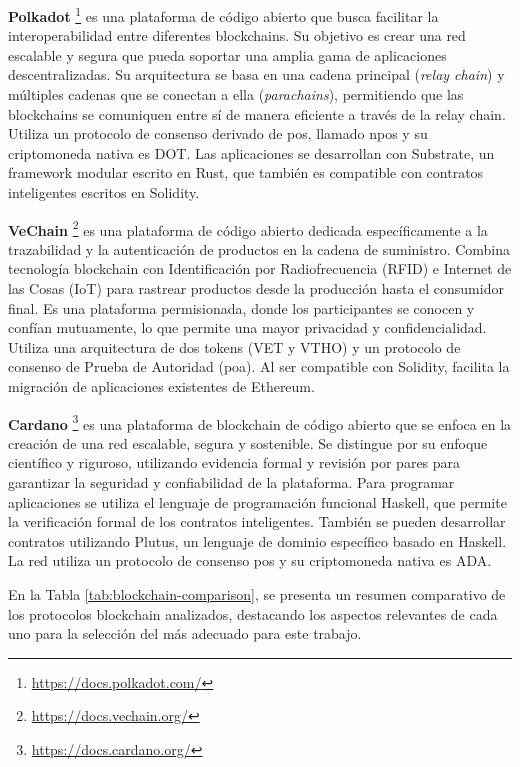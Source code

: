 \textbf{Polkadot} \footnote{\url{https://docs.polkadot.com/}}
es una plataforma de código abierto que busca facilitar la interoperabilidad entre diferentes blockchains. Su objetivo es crear una red escalable y segura que pueda soportar una amplia gama de aplicaciones descentralizadas. Su arquitectura se basa en una cadena principal (\textit{relay chain}) y múltiples cadenas que se conectan a ella (\textit{parachains}), permitiendo que las blockchains se comuniquen entre sí de manera eficiente a través de la relay chain. Utiliza un protocolo de consenso derivado de \acrshort{pos}, llamado \acrfull{npos} y su criptomoneda nativa es DOT. Las aplicaciones se desarrollan con Substrate, un framework modular escrito en Rust, que también es compatible con contratos inteligentes escritos en Solidity.

\textbf{VeChain} \footnote{\url{https://docs.vechain.org/}}
es una plataforma de código abierto dedicada específicamente a la trazabilidad y la autenticación de productos en la cadena de suministro. Combina tecnología blockchain con Identificación por Radiofrecuencia (RFID) e Internet de las Cosas (IoT) para rastrear productos desde la producción hasta el consumidor final. Es una plataforma permisionada, donde los participantes se conocen y confían mutuamente, lo que permite una mayor privacidad y confidencialidad. Utiliza una arquitectura de dos tokens (VET y VTHO) y un protocolo de consenso de Prueba de Autoridad (\acrshort{poa}). Al ser compatible con Solidity, facilita la migración de aplicaciones existentes de Ethereum.

\textbf{Cardano} \footnote{\url{https://docs.cardano.org/}}
es una plataforma de blockchain de código abierto que se enfoca en la creación de una red escalable, segura y sostenible. Se distingue por su enfoque científico y riguroso, utilizando evidencia formal y revisión por pares para garantizar la seguridad y confiabilidad de la plataforma. Para programar aplicaciones se utiliza el lenguaje de programación funcional Haskell, que permite la verificación formal de los contratos inteligentes. También se pueden desarrollar contratos utilizando Plutus, un lenguaje de dominio específico basado en Haskell. La red utiliza un protocolo de consenso \acrshort{pos} y su criptomoneda nativa es ADA.

En la Tabla \ref{tab:blockchain-comparison}, se presenta un resumen comparativo de los protocolos blockchain analizados, destacando los aspectos relevantes de cada uno para la selección del más adecuado para este trabajo.


